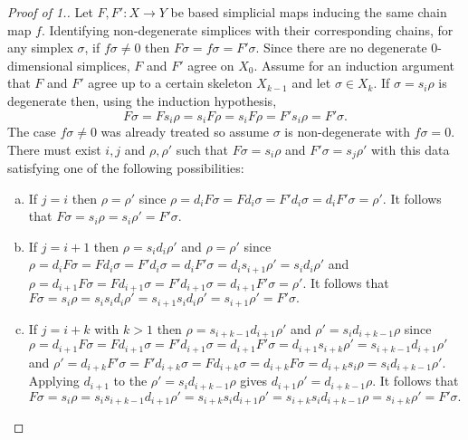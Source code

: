 \documentclass[thesis.tex]{subfiles}
\begin{document}
\begin{proof}[Proof of 1.]
Let $F,F':X\to Y$  be based simplicial maps inducing the same chain map $f$. Identifying non-degenerate simplices with their corresponding chains, for any simplex $\sigma$, if $f\sigma\neq0$ then $F\sigma=f\sigma=F'\sigma$. Since there are no degenerate $0$-dimensional simplices, $F$ and $F'$ agree on $X_0$. Assume for an induction argument that $F$ and $F'$ agree up to a certain skeleton $X_{k-1}$ and let $\sigma\in X_k$. If $\sigma=s_i\rho$ is degenerate then, using the induction hypothesis,
$$F\sigma=Fs_i\rho=s_iF\rho=s_iF\rho=F's_i\rho=F'\sigma.$$
The case $f\sigma\neq0$ was already treated so assume $\sigma$ is non-degenerate with $f\sigma=0$. There must exist $i,j$ and $\rho,\rho'$ such that $F\sigma=s_i\rho$ and $F'\sigma=s_j\rho'$ with this data satisfying one of the following possibilities:

\begin{enumerate}[a)]
\item If $j=i$ then $\rho=\rho'$ since $\rho=d_iF\sigma=Fd_i\sigma=F'd_i\sigma=d_iF'\sigma=\rho'$. It follows that $F\sigma=s_i\rho=s_i\rho'=F'\sigma$.

\item If $j=i+1$ then $\rho=s_id_i\rho'$ and $\rho=\rho'$ since $\rho=d_iF\sigma=Fd_i\sigma=F'd_i\sigma=d_iF'\sigma=d_is_{i+1}\rho'=s_id_i\rho'$ and $\rho=d_{i+1}F\sigma=Fd_{i+1}\sigma=F'd_{i+1}\sigma=d_{i+1}F'\sigma=\rho'$. It follows that $F\sigma=s_i\rho=s_is_id_i\rho'=s_{i+1}s_id_i\rho'=s_{i+1}\rho'=F'\sigma.$

\item If $j=i+k$ with $k>1$ then $\rho=s_{i+k-1}d_{i+1}\rho'$ and $\rho'=s_{i}d_{i+k-1}\rho$ since $\rho=d_{i+1}F\sigma=Fd_{i+1}\sigma=F'd_{i+1}\sigma=d_{i+1}F'\sigma=d_{i+1}s_{i+k}\rho'=s_{i+k-1}d_{i+1}\rho'$ and $\rho'=d_{i+k}F'\sigma=F'd_{i+k}\sigma=Fd_{i+k}\sigma=d_{i+k}F\sigma=d_{i+k}s_{i}\rho=s_{i}d_{i+k-1}\rho'$. Applying $d_{i+1}$ to the $\rho'=s_{i}d_{i+k-1}\rho$ gives $d_{i+1}\rho'=d_{i+k-1}\rho$. It follows that $F\sigma=s_i\rho=s_is_{i+k-1}d_{i+1}\rho'=s_{i+k}s_id_{i+1}\rho'=s_{i+k}s_id_{i+k-1}\rho=s_{i+k}\rho'=F'\sigma.$
\end{enumerate}
\end{proof}
\end{document}
